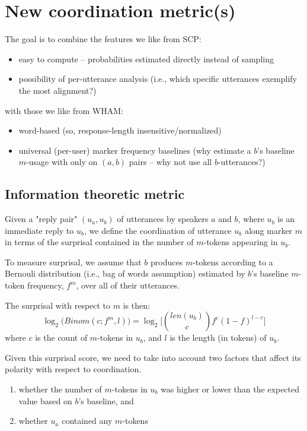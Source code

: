 \documentclass[12pt]{scrartcl}
\begin{document}
\section{New coordination metric(s)}

The goal is to combine the features we like from SCP:
\begin{itemize}
	\item easy to compute -- probabilities estimated directly instead of sampling
  \item possibility of per-utterance analysis (i.e., which specific utterances exemplify the most alignment?)
\end{itemize}
with those we like from WHAM:
\begin{itemize}
	\item word-based (so, response-length insensitive/normalized)
  \item universal (per-user) marker frequency baselines (why estimate a $b$'s baseline $m$-usage with only on $(a,b)$ pairs -- why not use all $b$-utterances?)
\end{itemize}

\subsection{Information theoretic metric}

Given a "reply pair" $(u_a, u_b)$ of utterances by speakers $a$ and $b$, where $u_b$ is an immediate reply to $u_b$, we define the coordination of utterance $u_b$ along marker $m$ in terms of the surprisal contained in the number of $m$-tokens appearing in $u_b$.

To measure surprisal, we assume that $b$ produces $m$-tokens according to a Bernouli distribution (i.e., bag of words assumption) estimated by $b$'s baseline $m$-token frequency, $f^m$, over all of their utterances.

The surprisal with respect to $m$ is then:
\[
	\log_2\big(Binom(c;f^m,l)\big) = \log_2\Big[\binom{len(u_b)}{c} f^{c}(1-f)^{l-c}\Big]
\]
where $c$ is the count of $m$-tokens in $u_b$, and $l$ is the length (in tokens) of $u_b$.

Given this surprisal score, we need to take into account two factors that affect its polarity with respect to coordination.
\begin{enumerate}
	\item whether the number of $m$-tokens in $u_b$ was higher or lower than the expected value based on $b$'s baseline, and
	\item whether $u_a$ contained any $m$-tokens
\end{enumerate}
\end{document}
